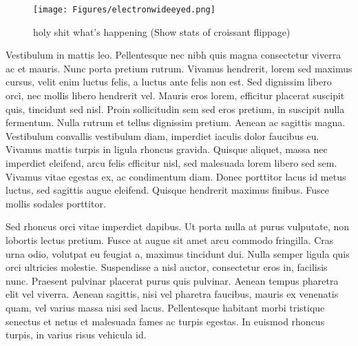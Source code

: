     \begin{figure}
        \centering
        \texttt{[image: Figures/electronwideeyed.png]}
        \caption{holy shit what's happening (Show stats of croissant flippage)}
        \label{fig:stm}
    \end{figure}

Vestibulum in mattis leo. Pellentesque nec nibh quis magna consectetur viverra ac et mauris. Nunc porta pretium rutrum. Vivamus hendrerit, lorem sed maximus cursus, velit enim luctus felis, a luctus ante felis non est. Sed dignissim libero orci, nec mollis libero hendrerit vel. Mauris eros lorem, efficitur placerat suscipit quis, tincidunt sed nisl. Proin sollicitudin sem sed eros pretium, in suscipit nulla fermentum. Nulla rutrum et tellus dignissim pretium. Aenean ac sagittis magna. Vestibulum convallis vestibulum diam, imperdiet iaculis dolor faucibus eu. Vivamus mattis turpis in ligula rhoncus gravida. Quisque aliquet, massa nec imperdiet eleifend, arcu felis efficitur nisl, sed malesuada lorem libero sed sem. Vivamus vitae egestas ex, ac condimentum diam. Donec porttitor lacus id metus luctus, sed sagittis augue eleifend. Quisque hendrerit maximus finibus. Fusce mollis sodales porttitor.

Sed rhoncus orci vitae imperdiet dapibus. Ut porta nulla at purus vulputate, non lobortis lectus pretium. Fusce at augue sit amet arcu commodo fringilla. Cras urna odio, volutpat eu feugiat a, maximus tincidunt dui. Nulla semper ligula quis orci ultricies molestie. Suspendisse a nisl auctor, consectetur eros in, facilisis nunc. Praesent pulvinar placerat purus quis pulvinar. Aenean tempus pharetra elit vel viverra. Aenean sagittis, nisi vel pharetra faucibus, mauris ex venenatis quam, vel varius massa nisi sed lacus. Pellentesque habitant morbi tristique senectus et netus et malesuada fames ac turpis egestas. In euismod rhoncus turpis, in varius risus vehicula id.

